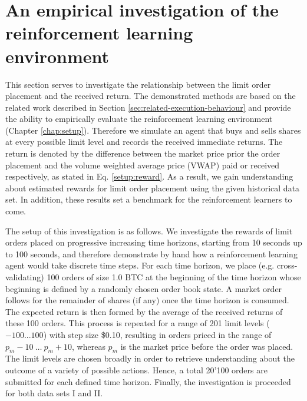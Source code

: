 \section{An empirical investigation of the reinforcement learning environment}
\label{sec:eval-empirical}
This section serves to investigate the relationship between the limit order placement and the received return.
The demonstrated methods are based on the related work described in Section \ref{sec:related-execution-behaviour} and provide the ability to empirically evaluate the reinforcement learning environment (Chapter \ref{chap:setup}).
Therefore we simulate an agent that buys and sells shares at every possible limit level and records the received immediate returns.
The return is denoted by the difference between the market price prior the order placement and the volume weighted average price (VWAP) paid or received respectively, as stated in Eq. \ref{setup:reward}.
As a result, we gain understanding about estimated rewards for limit order placement using the given historical data set.
In addition, these results set a benchmark for the reinforcement learners to come.

The setup of this investigation is as follows.
We investigate the rewards of limit orders placed on progressive increasing time horizons, starting from 10 seconds up to 100 seconds, and therefore demonstrate by hand how a reinforcement learning agent would take discrete time steps.
For each time horizon, we place (e.g. cross-validating) 100 orders of size 1.0 BTC at the beginning of the time horizon whose beginning is defined by a randomly chosen order book state. 
A market order follows for the remainder of shares (if any) once the time horizon is consumed.
The expected return is then formed by the average of the received returns of these 100 orders.
This process is repeated for a range of 201 limit levels ($-100...100$) with step size \$0.10, resulting in orders priced in the range of $p_m-10 \ \dots \ p_m+10$, whereas $p_m$ is the market price before the order was placed.
The limit levels are chosen broadly in order to retrieve understanding about the outcome of a variety of possible actions.
Hence, a total 20'100 orders are submitted for each defined time horizon.
Finally, the investigation is proceeded for both data sets I and II.

